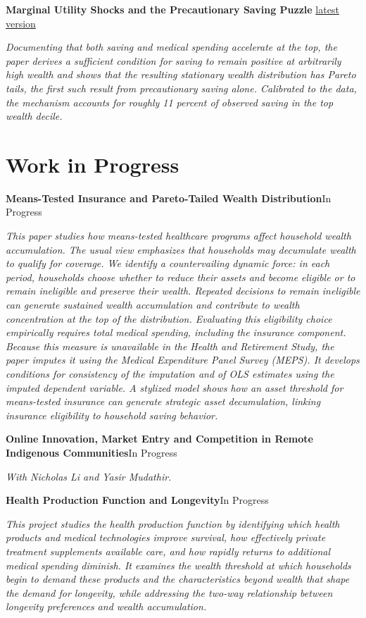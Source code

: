 \documentclass[11pt]{article}
\newcommand{\entry}[2]{%
  \textbf{#1}\hfill{#2}\par\vspace{2pt}%
}
\begin{document}
\textbf{Marginal Utility Shocks and the Precautionary Saving Puzzle}
\hfill
{\footnotesize\href{https://aminshz.github.io/my-website/paper1.pdf}{latest version}}

{\footnotesize\textit{Documenting that both saving and medical spending accelerate at the top, the paper derives a sufficient condition for saving to remain positive at arbitrarily high wealth and shows that the resulting stationary wealth distribution has Pareto tails, the first such result from precautionary saving alone. Calibrated to the data, the mechanism accounts for roughly 11 percent of observed saving in the top wealth decile.}}

\section{Work in Progress}

\entry{Means-Tested Insurance and Pareto-Tailed Wealth Distribution}{In Progress}
\textit{This paper studies how means-tested healthcare programs affect household wealth accumulation.
The usual view emphasizes that households may decumulate wealth to qualify for coverage. We identify
a countervailing dynamic force: in each period, households choose whether to reduce their assets and
become eligible or to remain ineligible and preserve their wealth. Repeated decisions to remain
ineligible can generate sustained wealth accumulation and contribute to wealth concentration at the
top of the distribution. Evaluating this eligibility choice empirically requires total medical spending,
including the insurance component. Because this measure is unavailable in the Health and Retirement
Study, the paper imputes it using the Medical Expenditure Panel Survey (MEPS). It develops conditions
for consistency of the imputation and of OLS estimates using the imputed dependent variable. A stylized model shows how
an asset threshold for means-tested insurance can generate strategic asset decumulation, linking
insurance eligibility to household saving behavior.}

\vspace{1em}

\entry{Online Innovation, Market Entry and Competition in Remote Indigenous Communities}{In Progress}
\textit{With Nicholas Li and Yasir Mudathir.}

\vspace{1em}

\entry{Health Production Function and Longevity}{In Progress}
\textit{This project studies the health production function by identifying which health products and
medical technologies improve survival, how effectively private treatment supplements available care,
and how rapidly returns to additional medical spending diminish. It examines the wealth threshold at
which households begin to demand these products and the characteristics beyond wealth that shape the
demand for longevity, while addressing the two-way relationship between longevity preferences and
wealth accumulation.}
\end{document}
